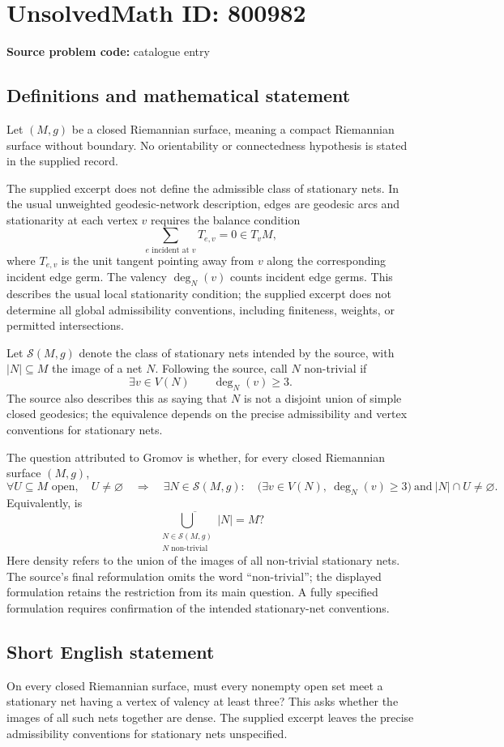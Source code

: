 \documentclass[11pt]{article}
\newcommand{\N}{\mathbb{N}}
\begin{document}
\section*{UnsolvedMath ID: 800982}
\textbf{Source problem code:} catalogue entry
\subsection{Definitions and mathematical statement}
Let \((M,g)\) be a closed Riemannian surface, meaning a compact Riemannian surface without boundary. No orientability or connectedness hypothesis is stated in the supplied record.

The supplied excerpt does not define the admissible class of stationary nets. In the usual unweighted geodesic-network description, edges are geodesic arcs and stationarity at each vertex \(v\) requires the balance condition
\[
\sum_{e\text{ incident at }v}T_{e,v}=0\in T_vM,
\]
where \(T_{e,v}\) is the unit tangent pointing away from \(v\) along the corresponding incident edge germ. The valency \(\deg_N(v)\) counts incident edge germs. This describes the usual local stationarity condition; the supplied excerpt does not determine all global admissibility conventions, including finiteness, weights, or permitted intersections.

Let \(\mathcal S(M,g)\) denote the class of stationary nets intended by the source, with \(|N|\subseteq M\) the image of a net \(N\). Following the source, call \(N\) non-trivial if
\[
\exists v\in V(N)\qquad \deg_N(v)\geq 3.
\]
The source also describes this as saying that \(N\) is not a disjoint union of simple closed geodesics; the equivalence depends on the precise admissibility and vertex conventions for stationary nets.

The question attributed to Gromov is whether, for every closed Riemannian surface \((M,g)\),
\[
\forall U\subseteq M\text{ open},\quad U\neq\varnothing
\quad\Longrightarrow\quad
\exists N\in\mathcal S(M,g):\quad
\bigl(\exists v\in V(N),\ \deg_N(v)\geq3\bigr)
\ \text{and}\ |N|\cap U\neq\varnothing.
\]
Equivalently, is
\[
\overline{\bigcup_{\substack{N\in\mathcal S(M,g)\\N\text{ non-trivial}}}|N|}=M?
\]
Here density refers to the union of the images of all non-trivial stationary nets. The source's final reformulation omits the word ``non-trivial''; the displayed formulation retains the restriction from its main question. A fully specified formulation requires confirmation of the intended stationary-net conventions.
\subsection{Short English statement}
On every closed Riemannian surface, must every nonempty open set meet a stationary net having a vertex of valency at least three? This asks whether the images of all such nets together are dense. The supplied excerpt leaves the precise admissibility conventions for stationary nets unspecified.
\end{document}
